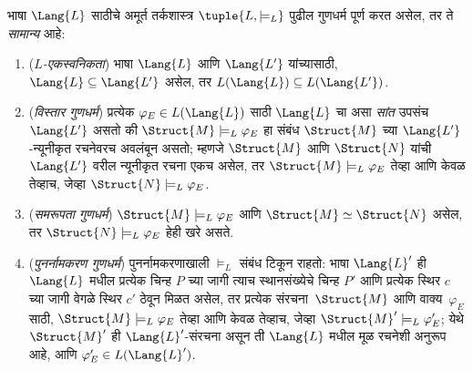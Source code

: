 \begin{defn}
भाषा $\Lang{L}$ साठीचे अमूर्त तर्कशास्त्र
$\tuple{L,\models_L}$ पुढील गुणधर्म पूर्ण करत असेल, तर ते \emph{सामान्य}
आहे:
\begin{enumerate}
\item (\emph{$L$-एकस्वनिकता}) भाषा $\Lang{L}$ आणि
  $\Lang{L'}$ यांच्यासाठी, $\Lang{L} \subseteq \Lang{L'}$ असेल, तर
  $L(\Lang{L}) \subseteq L(\Lang{L'})$.
\item (\emph{विस्तार गुणधर्म}) प्रत्येक $\varphi_{E} \in L(\Lang{L})$
  साठी $\Lang{L}$ चा असा \emph{सांत} उपसंच $\Lang{L'}$ असतो की
  $\Struct{M} \models_L \varphi_{E}$ हा संबंध $\Struct{M}$ च्या
  $\Lang{L'}$-न्यूनीकृत रचनेवरच अवलंबून असतो; म्हणजे $\Struct{M}$ आणि
  $\Struct{N}$ यांची $\Lang{L'}$ वरील न्यूनीकृत रचना एकच असेल, तर
  $\Struct{M} \models_L \varphi_{E}$ तेव्हा आणि केवळ तेव्हाच, जेव्हा
  $\Struct{N} \models_L \varphi_{E}$.
\item (\emph{समरूपता गुणधर्म}) $\Struct{M} \models_L \varphi_{E}$ आणि
  $\Struct{M} \simeq \Struct{N}$ असेल, तर $\Struct{N} \models_L \varphi_{E}$
  हेही खरे असते.
\item (\emph{पुनर्नामकरण गुणधर्म}) पुनर्नामकरणाखाली $\models_L$ संबंध
  टिकून राहतो: भाषा $\Lang{L}'$ ही $\Lang{L}$ मधील प्रत्येक
  चिन्ह $P$ च्या जागी त्याच स्थानसंख्येचे चिन्ह $P'$ आणि प्रत्येक स्थिर
  $c$ च्या जागी वेगळे स्थिर $c'$ ठेवून मिळत असेल, तर प्रत्येक
  संरचना~$\Struct{M}$ आणि वाक्य~$\varphi_{E}$ साठी,
  $\Struct{M} \models_L \varphi_{E}$ तेव्हा आणि केवळ तेव्हाच, जेव्हा
  $\Struct{M}' \models_L \varphi_{E}'$; येथे $\Struct{M}'$ ही $\Lang{L}'$-संरचना
  असून ती $\Lang{L}$ मधील मूळ रचनेशी अनुरूप आहे, आणि $\varphi_{E}' \in
  L(\Lang{L}')$.


\end{enumerate}
\end{defn}
